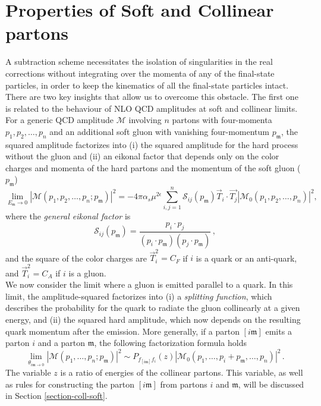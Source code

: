 \documentclass[a4paper, 12pt]{book}
\newcommand{\um}{\mathfrak{m}}
\begin{document}
\section{Properties of Soft and Collinear partons}
\label{properties}
A subtraction scheme necessitates the isolation of singularities in the real corrections without integrating over the momenta of any of the final-state particles, in order to keep the kinematics of all the final-state particles intact. There are two key insights that allow us to overcome this obstacle. The first one is related to the behaviour of NLO QCD amplitudes at soft and collinear limits. \\For a generic QCD amplitude $\mathcal{M}$ involving $n$ partons with four-momenta $p_1, p_2, \dots, p_n$ and an additional soft gluon with vanishing four-momentum $p_\um$, the squared amplitude factorizes into (i) the squared amplitude for the hard process without the gluon and (ii) an eikonal factor that depends only on the color charges and momenta of the hard partons and the momentum of the soft gluon ($p_\um$) \cite{Catani:1999ss}
\begin{equation}
    \lim_{E_\um \rightarrow 0}|\mathcal{M}(p_1, p_2, \dots, p_n; p_\um)|^2= - 4\pi \alpha_s \mu^{2\epsilon} \sum_{i,j=1}^n \mathcal{S}_{ij}(p_\um) \vec{T}_i \cdot \vec{T_j} |\mathcal{M}_0(p_1, p_2, \dots, p_n)|^2,
    \label{ampl-soft}
\end{equation}
where the \emph{general eikonal factor} is
\begin{equation}
    \mathcal{S}_{ij}(p_\um) = \frac{p_i \cdot p_j}{(p_i \cdot p_\um)(p_j \cdot p_\um)}  \,, 
    \label{eikonal}
\end{equation}
and the square of the color charges are $\vec{T}_i^2= C_F$ if $i$ is a quark or an anti-quark, and $\vec{T}_i^2= C_A$ if $i$ is a gluon. \\

We now consider the limit where a gluon is emitted parallel to a quark. In this limit, the amplitude-squared factorizes into (i) a \emph{splitting function}, which describes the probability for the quark to radiate the gluon collinearly at a given energy, and (ii) the squared hard amplitude, which now depends on the resulting quark momentum after the emission. More generally, if a parton $[i\um]$ emits a parton $i$ and a parton $\um$, the following factorization formula holds
\begin{equation}
    \lim_{\theta_{i \um \rightarrow 0}}|\mathcal{M}(p_1, \dots, p_n; p_\um)|^2 \sim P_{f_{[i\um]}f_i} (z) |\mathcal{M}_0(p_1, \dots , p_i + p_\um, \dots, p_n)|^2  \,.
    \label{ampl-coll}
\end{equation}
The variable $z$ is a ratio of energies of the collinear partons. This variable, as well as rules for constructing the parton $[i\um]$ from partons $i$ and $\um$, will be discussed in Section \ref{section-coll-soft}. \\
\end{document}

